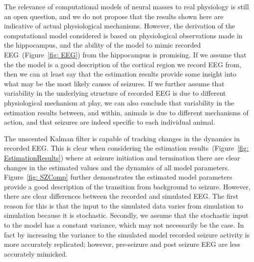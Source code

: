 The relevance of computational models of neural masses to real physiology is still an open question, and we do not propose that the results shown here are indicative of actual physiological mechanisms. However, the derivation of the computational model considered is based on physiological observations made in the hippocampus\citep{freeman1963electrical,wilson1973mathematical,white2000networks}, and the ability of the model to mimic recorded EEG~(Figure~\ref{fig: EEG}) from the hippocampus is promising. If we assume that the the model is a good description of the cortical region we record EEG from, then we can at least say that the estimation results provide some insight into what may be the most likely causes of seizures. If we further assume that variability in the underlying structure of recorded EEG is due to different physiological mechanism at play, we can also conclude that variability in the estimation results between, and within, animals is due to different mechanisms of action, and that seizures are indeed specific to each individual animal.










The unscented Kalman filter is capable of tracking changes in the dynamics in recorded EEG. This is clear when considering the estimation results~(Figure~\ref{fig: EstimationResults}) where at seizure initiation and termination there are clear changes in the estimated values and the dynamics of all model parameters. Figure~\ref{fig: SZComp} further demonstrates the estimated model parameters provide a good description of the transition from background to seizure. However, there are clear differences between the recorded and simulated EEG. The first reason for this is that the input to the simulated data varies from simulation to simulation because it is stochastic. Secondly, we assume that the stochastic input to the model has a constant variance, which may not necessarily be the case. In fact by increasing the variance to the simulated model recorded seizure activity is  more accurately replicated; however, pre-seizure and post seizure EEG are less accurately mimicked.

